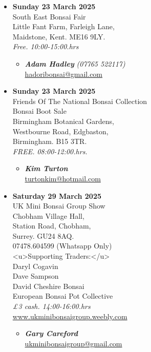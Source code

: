 \begin{itemize}
    \item \textbf{Sunday 23 March 2025}
    \\
    South East Bonsai Fair \\
    Little Fant Farm, Farleigh Lane, \\
    Maidstone, Kent. ME16 9LY.
    \\
    \emph{Free. 10:00-15:00.hrs}
    \begin{itemize}
        \item \textbf{\emph{Adam Hadley}} \emph{(07765 522117)} \\
        \href{mailto:hadoribonsai@gmail.com}{hadoribonsai@gmail.com} 
    \end{itemize}

    \item \textbf{Sunday 23 March 2025}
    \\
    Friends Of The National Bonsai Collection \\
    Bonsai Boot Sale \\
    Birmingham Botanical Gardens, \\
    Westbourne Road, Edgbaston, \\
    Birmingham. B15 3TR.
    \\
    \emph{FREE. 08:00-12:00.hrs.}
    \begin{itemize}
        \item \textbf{\emph{Kim Turton}} \\
        \href{mailto:turtonkim@hotmail.com}{turtonkim@hotmail.com} 
    \end{itemize}

    \item \textbf{Saturday 29 March 2025}
    \\
    UK Mini Bonsai Group Show \\
    Chobham Village Hall, \\
    Station Road, Chobham, \\
    Surrey. GU24 8AQ. \\
    07478.604599 (Whatsapp Only) \\
    <u>Supporting Traders:</u> \\
    Daryl Cogavin \\
    Dave Sampson \\
    David Cheshire Bonsai \\
    European Bonsai Pot Collective
    \\
    \emph{£3 cash. 14:00-16:00.hrs}
    \\
    \href{https://www.ukminibonsaigroup.weebly.com}{www.ukminibonsaigroup.weebly.com}
    \begin{itemize}
        \item \textbf{\emph{Gary Careford}} \\
        \href{mailto:ukminibonsaigroup@gmail.com}{ukminibonsaigroup@gmail.com} 
    \end{itemize}


\end{itemize}
